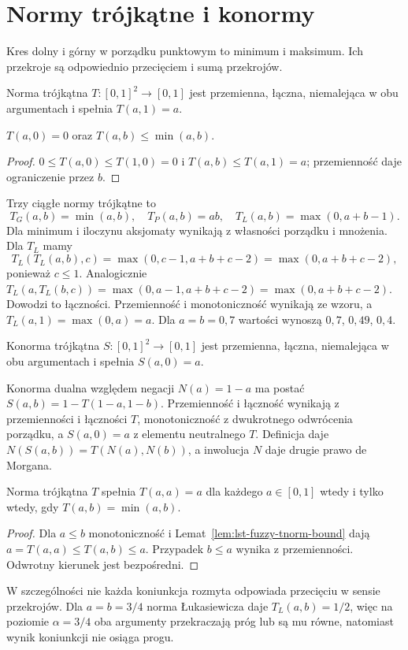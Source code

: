 \section{Normy trójkątne i konormy}
Kres dolny i górny w porządku punktowym to minimum i maksimum.
Ich przekroje są odpowiednio przecięciem i sumą przekrojów.
\begin{definicja}\label{def:lst-fuzzy-tnorm}
Norma trójkątna $T:[0,1]^2\to[0,1]$ jest przemienna,
łączna, niemalejąca w obu argumentach i spełnia $T(a,1)=a$.
\end{definicja}
\begin{lemat}\label{lem:lst-fuzzy-tnorm-bound}
$T(a,0)=0$ oraz $T(a,b)\leq\min(a,b)$.
\end{lemat}
\begin{proof}
$0\leq T(a,0)\leq T(1,0)=0$ i $T(a,b)\leq T(a,1)=a$;
przemienność daje ograniczenie przez $b$.
\end{proof}
\begin{przyklad}\label{ex:lst-fuzzy-three-tnorms}
Trzy ciągłe normy trójkątne to
\[
T_G(a,b)=\min(a,b),\quad T_P(a,b)=ab,\quad
T_L(a,b)=\max(0,a+b-1).
\]
Dla minimum i iloczynu aksjomaty wynikają z własności porządku
i mnożenia. Dla $T_L$ mamy
\[
 T_L(T_L(a,b),c)=\max(0,c-1,a+b+c-2)
 =\max(0,a+b+c-2),
\]
ponieważ $c\leq1$. Analogicznie
$T_L(a,T_L(b,c))=\max(0,a-1,a+b+c-2)
=\max(0,a+b+c-2)$. Dowodzi to łączności.
Przemienność i monotoniczność wynikają ze wzoru,
a $T_L(a,1)=\max(0,a)=a$. Dla $a=b=0{,}7$ wartości wynoszą $0{,}7$, $0{,}49$, $0{,}4$.
\end{przyklad}
\begin{definicja}\label{def:ncl-tconorm}
Konorma trójkątna $S:[0,1]^2\to[0,1]$ jest przemienna,
łączna, niemalejąca w obu argumentach i spełnia $S(a,0)=a$.
\end{definicja}
Konorma dualna względem negacji $N(a)=1-a$ ma postać
$S(a,b)=1-T(1-a,1-b)$. Przemienność i łączność wynikają z
przemienności i łączności $T$, monotoniczność z dwukrotnego
odwrócenia porządku, a $S(a,0)=a$ z elementu neutralnego $T$.
Definicja daje $N(S(a,b))=T(N(a),N(b))$, a inwolucja $N$
daje drugie prawo de Morgana.

\begin{stwierdzenie}\label{prop:ncl-tnorm-idempotence}
Norma trójkątna $T$ spełnia $T(a,a)=a$ dla każdego
$a\in[0,1]$ wtedy i tylko wtedy, gdy $T(a,b)=\min(a,b)$.
\end{stwierdzenie}
\begin{proof}
Dla $a\leq b$ monotoniczność i Lemat~\ref{lem:lst-fuzzy-tnorm-bound}
dają $a=T(a,a)\leq T(a,b)\leq a$. Przypadek $b\leq a$
wynika z przemienności. Odwrotny kierunek jest bezpośredni.
\end{proof}
W szczególności nie każda koniunkcja rozmyta odpowiada
przecięciu w sensie przekrojów. Dla $a=b=3/4$ norma
Łukasiewicza daje $T_L(a,b)=1/2$, więc na poziomie
$\alpha=3/4$ oba argumenty przekraczają próg lub są mu
równe, natomiast wynik koniunkcji nie osiąga progu.

